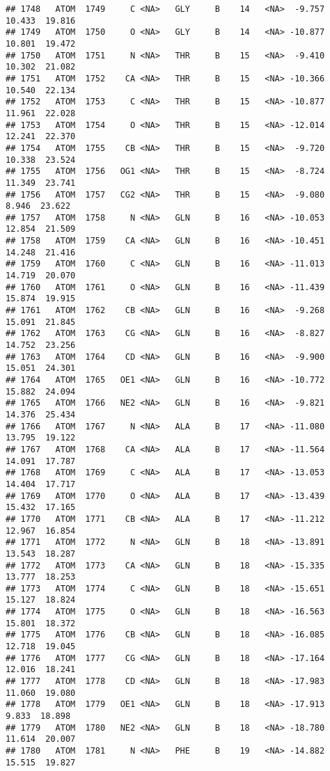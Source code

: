 \documentclass[
]{article}
\begin{document}
\begin{verbatim}
## 1748   ATOM  1749     C <NA>   GLY     B    14   <NA>  -9.757  10.433  19.816
## 1749   ATOM  1750     O <NA>   GLY     B    14   <NA> -10.877  10.801  19.472
## 1750   ATOM  1751     N <NA>   THR     B    15   <NA>  -9.410  10.302  21.082
## 1751   ATOM  1752    CA <NA>   THR     B    15   <NA> -10.366  10.540  22.134
## 1752   ATOM  1753     C <NA>   THR     B    15   <NA> -10.877  11.961  22.028
## 1753   ATOM  1754     O <NA>   THR     B    15   <NA> -12.014  12.241  22.370
## 1754   ATOM  1755    CB <NA>   THR     B    15   <NA>  -9.720  10.338  23.524
## 1755   ATOM  1756   OG1 <NA>   THR     B    15   <NA>  -8.724  11.349  23.741
## 1756   ATOM  1757   CG2 <NA>   THR     B    15   <NA>  -9.080   8.946  23.622
## 1757   ATOM  1758     N <NA>   GLN     B    16   <NA> -10.053  12.854  21.509
## 1758   ATOM  1759    CA <NA>   GLN     B    16   <NA> -10.451  14.248  21.416
## 1759   ATOM  1760     C <NA>   GLN     B    16   <NA> -11.013  14.719  20.070
## 1760   ATOM  1761     O <NA>   GLN     B    16   <NA> -11.439  15.874  19.915
## 1761   ATOM  1762    CB <NA>   GLN     B    16   <NA>  -9.268  15.091  21.845
## 1762   ATOM  1763    CG <NA>   GLN     B    16   <NA>  -8.827  14.752  23.256
## 1763   ATOM  1764    CD <NA>   GLN     B    16   <NA>  -9.900  15.051  24.301
## 1764   ATOM  1765   OE1 <NA>   GLN     B    16   <NA> -10.772  15.882  24.094
## 1765   ATOM  1766   NE2 <NA>   GLN     B    16   <NA>  -9.821  14.376  25.434
## 1766   ATOM  1767     N <NA>   ALA     B    17   <NA> -11.080  13.795  19.122
## 1767   ATOM  1768    CA <NA>   ALA     B    17   <NA> -11.564  14.091  17.787
## 1768   ATOM  1769     C <NA>   ALA     B    17   <NA> -13.053  14.404  17.717
## 1769   ATOM  1770     O <NA>   ALA     B    17   <NA> -13.439  15.432  17.165
## 1770   ATOM  1771    CB <NA>   ALA     B    17   <NA> -11.212  12.967  16.854
## 1771   ATOM  1772     N <NA>   GLN     B    18   <NA> -13.891  13.543  18.287
## 1772   ATOM  1773    CA <NA>   GLN     B    18   <NA> -15.335  13.777  18.253
## 1773   ATOM  1774     C <NA>   GLN     B    18   <NA> -15.651  15.127  18.824
## 1774   ATOM  1775     O <NA>   GLN     B    18   <NA> -16.563  15.801  18.372
## 1775   ATOM  1776    CB <NA>   GLN     B    18   <NA> -16.085  12.718  19.045
## 1776   ATOM  1777    CG <NA>   GLN     B    18   <NA> -17.164  12.016  18.241
## 1777   ATOM  1778    CD <NA>   GLN     B    18   <NA> -17.983  11.060  19.080
## 1778   ATOM  1779   OE1 <NA>   GLN     B    18   <NA> -17.913   9.833  18.898
## 1779   ATOM  1780   NE2 <NA>   GLN     B    18   <NA> -18.780  11.614  20.007
## 1780   ATOM  1781     N <NA>   PHE     B    19   <NA> -14.882  15.515  19.827

\end{verbatim}
\end{document}
